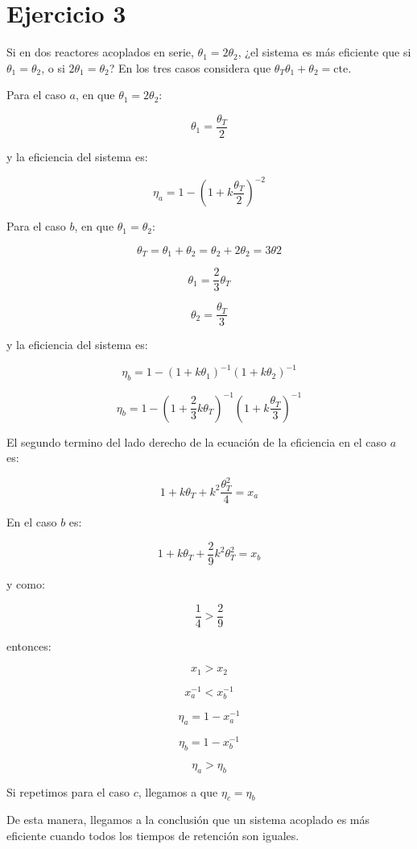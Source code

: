 \documentclass[11pt]{article}
\begin{document}
\section{Ejercicio 3}

Si en dos reactores acoplados en serie, \( \theta_1 = 2 \theta_2 \), ¿el sistema es más eficiente que si \( \theta_1 = \theta_2 \), o si  \( 2 \theta_1 = \theta_2 \)? En los tres casos considera que \( \theta_T \theta_1 + \theta_2 = \text{cte.} \)

\bigskip \bigskip

Para el caso \( a \), en que \( \theta_1 = 2 \theta_2 \):

\[ \theta_1 = \frac{ \theta_T }{2} \]

y la eficiencia del sistema es:

\[ \eta_a = 1 - \left( 1 + k \frac{ \theta_T }{2} \right) ^ {-2} \]

Para el caso \( b \), en que \( \theta_1 = \theta_2 \):

\[ \theta_T = \theta_1 + \theta_2 = \theta_2 + 2 \theta_2 = 3 \theta 2 \]

\[ \theta_1 = \frac{2}{3} \theta_T \]

\[ \theta_2 = \frac{\theta_T}{3} \]

y la eficiencia del sistema es:

\[ \eta_b = 1 - \left( 1 + k \theta_1 \right) ^ {-1} \left( 1 + k \theta_2 \right) ^ {-1} \]

\[ \eta_b = 1 - \left( 1 + \frac{2}{3} k \theta_T \right) ^ {-1} \left( 1 + k \frac{\theta_T}{3} \right) ^ {-1} \]

El segundo termino del lado derecho de la ecuación de la eficiencia en el caso \( a \) es:

\[ 1 + k \theta_T + k ^ 2 \frac{ \theta_{T}^{2} }{4} = x_a \]

En el caso \( b \) es:

\[ 1 + k \theta_T + \frac{2}{9} k ^ 2 \theta_{T}^{2} = x_b \]

y como:

\[ \frac{1}{4} > \frac{2}{9} \]

entonces: 

\[ x_1 > x_2 \]

\[ x_{a}^{-1} < x_{b}^{-1} \]

\[ \eta_a = 1 - x_{a}^{-1} \]

\[ \eta_b = 1 - x_{b}^{-1} \]

\[ \boxed{ \eta_a > \eta_b } \]

Si repetimos para el caso \( c \), llegamos a que \( \eta_c = \eta_b \)

De esta manera, llegamos a la conclusión que un sistema acoplado es más eficiente cuando todos los tiempos de retención son iguales.

\end{document}
